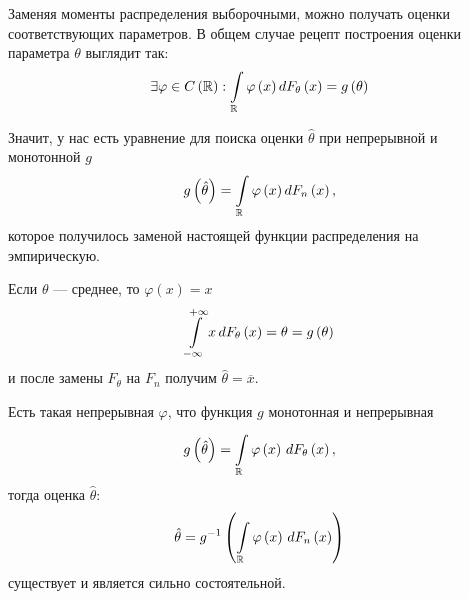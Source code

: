 Заменяя моменты распределения выборочными, можно получать оценки
соответствующих параметров.
В общем случае рецепт построения оценки параметра $\theta$ выглядит так:
$$\exists\varphi\in C\left(\mathbb{R}\right):
  \int\limits_{\mathbb{R}}\varphi\left(x\right)d\cdfof{\theta}{x}
    =g\left(\theta\right)$$

Значит, у нас есть уравнение для поиска оценки $\hat{\theta}$
при непрерывной и монотонной $g$
\begin{align*}
  g\left(\hat{\theta}\right)
    =\int\limits_{\mathbb{R}}\varphi\left(x\right)d\cdfn{x},
\end{align*}
которое получилось заменой настоящей функции распределения на эмпирическую.

\begin{example}
  Если $\theta$ --- среднее, то $\varphi\left(x\right)=x$
  \begin{equation*}
    \integral{-\infty}{+\infty}{\cdfof{\theta}{x}}{x}
    = \theta
    = g\left(\theta\right)
  \end{equation*}
  и после замены $F_\theta$ на $F_n$ получим $\hat{\theta} = \overline{x}$.
\end{example}
\begin{theorem}
  Есть такая непрерывная $\varphi$, что функция $g$ монотонная и непрерывная
  \begin{equation}\label{eq:unknown_parameter}
    g\left(\hat{\theta}\right)
    = \integrall{\mathbb{R}}{d\cdfof{\theta}{x}}{
      \varphi\left( x \right)},
  \end{equation}
  тогда оценка $\hat{\theta}$:
  \begin{equation*}
    \hat{\theta}
    = g^{-1}\left( \integrall{\mathbb{R}}{d\cdfn{x}}{
      \varphi\left( x \right)} \right)
  \end{equation*}
  существует и является сильно состоятельной.
\end{theorem}
